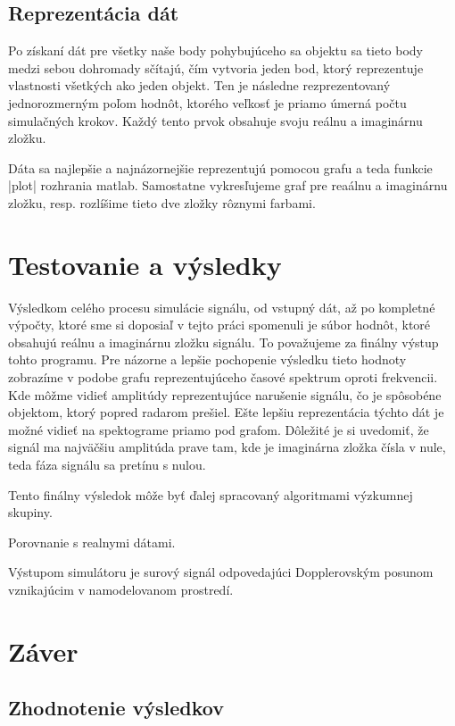     
  \section{Reprezentácia dát}
  \hspace{0.6cm}Po získaní dát pre všetky naše body pohybujúceho sa objektu sa tieto body medzi sebou dohromady sčítajú, čím vytvoria jeden bod, ktorý reprezentuje vlastnosti všetkých ako jeden objekt. Ten je následne rezprezentovaný jednorozmerným poľom hodnôt, ktorého veľkosť je priamo úmerná počtu simulačných krokov. Každý tento prvok obsahuje svoju reálnu a imaginárnu zložku.\newline

  Dáta sa najlepšie a najnázornejšie reprezentujú pomocou grafu a teda funkcie |plot| rozhrania matlab. Samostatne vykresľujeme graf pre reaálnu a imaginárnu zložku, resp. rozlíšime tieto dve zložky rôznymi farbami.

\chapter{Testovanie a výsledky}

  Výsledkom celého procesu simulácie signálu, od vstupný dát, až po kompletné výpočty, ktoré sme si doposiaľ v tejto práci spomenuli je súbor hodnôt, ktoré obsahujú reálnu a imaginárnu zložku signálu.
  To považujeme za finálny výstup tohto programu. Pre názorne a lepšie pochopenie výsledku tieto hodnoty zobrazíme v podobe grafu reprezentujúceho časové spektrum oproti frekvencii. Kde môžme vidieť amplitúdy reprezentujúce narušenie signálu, čo je spôsobéne objektom, ktorý popred radarom prešiel.
  Ešte lepšiu reprezentácia týchto dát je možné vidieť na spektograme priamo pod grafom. 
  Dôležité je si uvedomiť, že signál ma najväčšiu amplitúda prave tam, kde je imaginárna zložka čísla v nule, teda fáza signálu sa pretínu s nulou.

  Tento finálny výsledok môže byť ďalej spracovaný algoritmami výzkumnej skupiny.

  Porovnanie s realnymi dátami.

  Výstupom simulátoru je surový signál odpovedajúci Dopplerovským posunom vznikajúcim v namodelovanom prostredí.  

\chapter{Záver}

  \section{Zhodnotenie výsledkov}
    \hspace{0.6cm}

